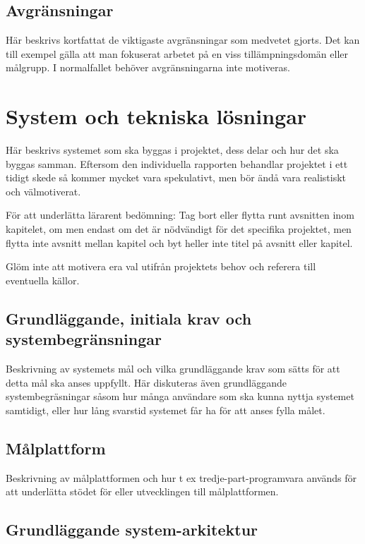 \documentclass[a4paper,12pt,oneside,final]{extbook}
\begin{document}
\section{Avgränsningar}

Här beskrivs kortfattat de viktigaste avgränsningar som medvetet
gjorts. Det kan till exempel gälla att man fokuserat arbetet på en
viss tillämpningsdomän eller målgrupp. I normalfallet behöver
avgränsningarna inte motiveras.


\chapter{System och tekniska lösningar}

Här beskrivs systemet som ska byggas i projektet, dess delar och hur
det ska byggas samman. Eftersom den individuella rapporten behandlar
projektet i ett tidigt skede så kommer mycket vara spekulativt, men
bör ändå vara realistiskt och välmotiverat.

För att underlätta lärarent bedömning: Tag bort eller flytta runt
avsnitten inom kapitelet, om men endast om det är nödvändigt för det
specifika projektet, men flytta inte avsnitt mellan kapitel och byt
heller inte titel på avsnitt eller kapitel.

Glöm inte att motivera era val utifrån projektets behov och referera
till eventuella källor.

\section{Grundläggande, initiala krav och systembegränsningar}

Beskrivning av systemets mål och vilka grundläggande krav som sätts
för att detta mål ska anses uppfyllt. Här diskuteras även
grundläggande systembegräsningar såsom hur många användare som ska
kunna nyttja systemet samtidigt, eller hur lång svarstid systemet får
ha för att anses fylla målet.

\section{Målplattform}

Beskrivning av målplattformen och hur t ex tredje-part-programvara
används för att underlätta stödet för eller utvecklingen till
målplattformen.

\section{Grundläggande system-arkitektur}
\end{document}
